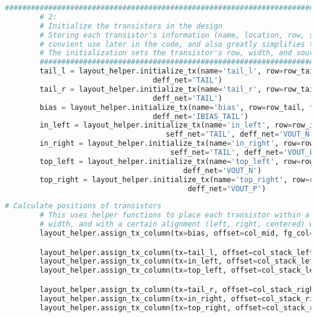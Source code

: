 \clearpage
\begin{lstlisting}[language=Python, caption=Assigning transistors to a row and initializing, label={lst:tx_init}, float]
	################################################################################
        # 2:
        # Initialize the transistors in the design
        # Storing each transistor's information (name, location, row, size, etc) in a dictionary object allows for
        # convient use later in the code, and also greatly simplifies the schematic generation
        # The initialization sets the transistor's row, width, and source/drain net names for proper dummy creation
        ################################################################################
        tail_l = layout_helper.initialize_tx(name='tail_l', row=row_tail, fg_spec='bottom_tail',
                                  deff_net='TAIL')
        tail_r = layout_helper.initialize_tx(name='tail_r', row=row_tail, fg_spec='bottom_tail',
                                  deff_net='TAIL')
        bias = layout_helper.initialize_tx(name='bias', row=row_tail, fg_spec='bottom_bias',
                                  deff_net='IBIAS_TAIL')
        in_left = layout_helper.initialize_tx(name='in_left', row=row_input, fg_spec='bottom_in',
                                     seff_net='TAIL', deff_net='VOUT_N')
        in_right = layout_helper.initialize_tx(name='in_right', row=row_input, fg_spec='bottom_in',
                                      seff_net='TAIL', deff_net='VOUT_P')
        top_left = layout_helper.initialize_tx(name='top_left', row=row_mirror, fg_spec='top',
                                         deff_net='VOUT_N')
        top_right = layout_helper.initialize_tx(name='top_right', row=row_mirror, fg_spec='top',
                                          deff_net='VOUT_P')
\end{lstlisting}
\clearpage
\begin{lstlisting}[language=Python, caption=Assigning transistors to columns, label={lst:col_assign}, float]
	# Calculate positions of transistors
        # This uses helper functions to place each transistor within a stack/column of a specified starting index and
        # width, and with a certain alignment (left, right, centered) within that column
        layout_helper.assign_tx_column(tx=bias, offset=col_mid, fg_col=fg_mid, align=0)

        layout_helper.assign_tx_column(tx=tail_l, offset=col_stack_left, fg_col=fg_stack, align=0)
        layout_helper.assign_tx_column(tx=in_left, offset=col_stack_left, fg_col=fg_stack, align=0)
        layout_helper.assign_tx_column(tx=top_left, offset=col_stack_left, fg_col=fg_stack, align=0)

        layout_helper.assign_tx_column(tx=tail_r, offset=col_stack_right, fg_col=fg_stack, align=0)
        layout_helper.assign_tx_column(tx=in_right, offset=col_stack_right, fg_col=fg_stack, align=0)
        layout_helper.assign_tx_column(tx=top_right, offset=col_stack_right, fg_col=fg_stack, align=0)
\end{lstlisting}
